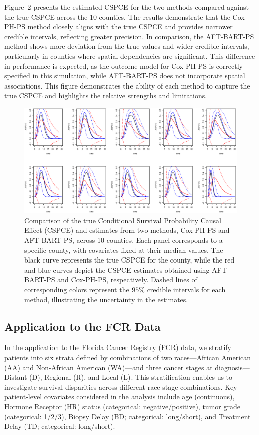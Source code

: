 \documentclass[useAMS,referee]{biom}
\begin{document}
Figure~2 presents the estimated CSPCE for the two methods compared against the true CSPCE across the 10 counties. The results demonstrate that the Cox-PH-PS method closely aligns with the true CSPCE and provides narrower credible intervals, reflecting greater precision. In comparison, the AFT-BART-PS method shows more deviation from the true values and wider credible intervals, particularly in counties where spatial dependencies are significant. This difference in performance is expected, as the outcome model for Cox-PH-PS is correctly specified in this simulation, while AFT-BART-PS does not incorporate spatial associations. This figure demonstrates the ability of each method to capture the true CSPCE and highlights the relative strengths and limitations.


\begin{figure}
    \centering
    \includegraphics[width=1.05\linewidth]{pics/Countywise_CSPCE_sim_A.eps}
    \caption{Comparison of the true Conditional Survival Probability Causal Effect (CSPCE) and estimates from two methods, Cox-PH-PS and AFT-BART-PS, across 10 counties. Each panel corresponds to a specific county, with covariates fixed at their median values. The black curve represents the true CSPCE for the county, while the red and blue curves depict the CSPCE estimates obtained using AFT-BART-PS and Cox-PH-PS, respectively. Dashed lines of corresponding colors represent the $95\%$ credible intervals for each method, illustrating the uncertainty in the estimates.}
    \label{fig:CSPCE}
\end{figure}

\subsection{Application to the FCR Data}
In the application to the Florida Cancer Registry (FCR) data, we stratify patients into six strata defined by combinations of two races—African American (AA) and Non-African American (WA)—and three cancer stages at diagnosis—Distant (D), Regional (R), and Local (L). This stratification enables us to investigate survival disparities across different race-stage combinations. Key patient-level covariates considered in the analysis include age (continuous), Hormone Receptor (HR) status (categorical: negative/positive), tumor grade (categorical: 1/2/3), Biopsy Delay (BD; categorical: long/short), and Treatment Delay (TD; categorical: long/short).
\end{document}

